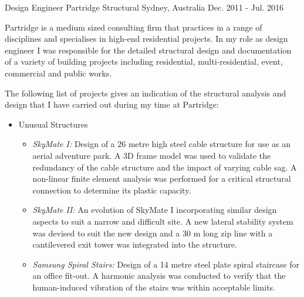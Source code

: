 

\begin{cventries}

  \cventry
    {Design Engineer} %
    {Partridge Structural} %
    {Sydney, Australia} %
    {Dec. 2011 - Jul. 2016} %
    {
      \begin{cvitems} %
        \item {Partridge is a medium sized consulting firm that practices in a range of disciplines and specialises in high-end residential projects. In my role as design engineer I was responsible for the detailed structural design and documentation of a variety of building projects including residential, multi-residential, event, commercial and public works.}
        \item {The following list of projects gives an indication of the structural analysis and design that I have carried out during my time at Partridge:}
        \begin{itemize}
          \item Unusual Structures
          \begin{itemize}
            \item \emph{SkyMate I:} Design of a 26 metre high steel cable structure for use as an aerial adventure park. A 3D frame model was used to validate the redundancy of the cable structure and the impact of varying cable sag. A non-linear finite element analysis was performed for a critical structural connection to determine its plastic capacity.
            \item \emph{SkyMate II:} An evolution of SkyMate I incorporating similar design aspects to suit a narrow and difficult site. A new lateral stability system was devised to suit the new design and a 30 m long zip line with a cantilevered exit tower was integrated into the structure.
            \item \emph{Samsung Spiral Stairs:} Design of a 14 metre steel plate spiral staircase for an office fit-out. A harmonic analysis was conducted to verify that the human-induced vibration of the stairs was within acceptable limits.

\end{itemize}
\end{itemize}
\end{cvitems}}
\end{cventries}
